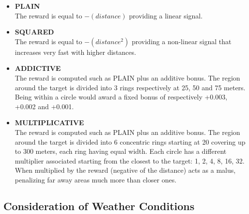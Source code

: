 \begin{itemize}
\item {\bf PLAIN}\\
The reward is equal to $-(distance)$ providing a linear signal.

\item {\bf SQUARED}\\
The reward is equal to $-(distance^2)$ providing a non-linear signal that increases very fast with higher distances.

\item {\bf ADDICTIVE}\\
The reward is computed such as PLAIN plus an additive bonus. The region around the target is divided into 3 rings respectively at 25, 50 and 75 meters. Being within a circle would award a fixed bonus of respectively +0.003, +0.002 and +0.001.

\item {\bf MULTIPLICATIVE}\\
The reward is computed such as PLAIN plus an additive bonus. The region around the target is divided into 6 concentric rings starting at 20 covering up to 300 meters, each ring having equal width. Each circle has a different multiplier associated starting from the closest to the target: 1, 2, 4, 8, 16, 32. When multiplied by the reward (negative of the distance) acts as a malus, penalizing far away areas much more than closer ones. 

\end{itemize}


\subsection{Consideration of Weather Conditions}

